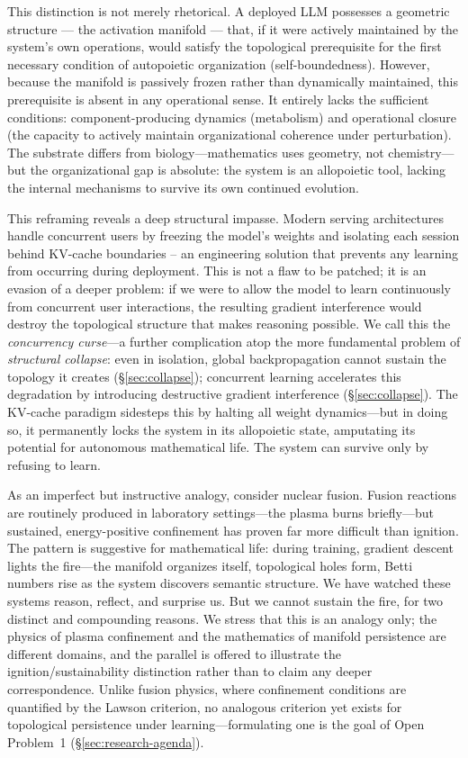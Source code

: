 \documentclass{article}
\begin{document}
This distinction is not merely rhetorical. A deployed LLM possesses a geometric structure --- the activation manifold --- that, if it were actively maintained by the system's own operations, would satisfy the topological prerequisite for the first necessary condition of autopoietic organization \citep{Varela1974autopoiesis} (self-boundedness). However, because the manifold is passively frozen rather than dynamically maintained, this prerequisite is absent in any operational sense. It entirely lacks the sufficient conditions: component-producing dynamics (metabolism) and operational closure (the capacity to actively maintain organizational coherence under perturbation). The substrate differs from biology---mathematics uses geometry, not chemistry---but the organizational gap is absolute: the system is an allopoietic tool, lacking the internal mechanisms to survive its own continued evolution.

This reframing reveals a deep structural impasse. Modern serving architectures handle concurrent users by freezing the model's weights and isolating each session behind KV-cache boundaries -- an engineering solution that prevents any learning from occurring during deployment. This is not a flaw to be patched; it is an evasion of a deeper problem: if we were to allow the model to learn continuously from concurrent user interactions, the resulting gradient interference would destroy the topological structure that makes reasoning possible. We call this the \emph{concurrency curse}---a further complication atop the more fundamental problem of \emph{structural collapse}: even in isolation, global backpropagation cannot sustain the topology it creates (\S\ref{sec:collapse}); concurrent learning accelerates this degradation by introducing destructive gradient interference (\S\ref{sec:collapse}). The KV-cache paradigm sidesteps this by halting all weight dynamics---but in doing so, it permanently locks the system in its allopoietic state, amputating its potential for autonomous mathematical life. The system can survive only by refusing to learn.

As an imperfect but instructive analogy, consider nuclear fusion. Fusion reactions are routinely produced in laboratory settings---the plasma burns briefly---but sustained, energy-positive confinement has proven far more difficult than ignition. The pattern is suggestive for mathematical life: during training, gradient descent lights the fire---the manifold organizes itself, topological holes form, Betti numbers rise as the system discovers semantic structure. We have watched these systems reason, reflect, and surprise us. But we cannot sustain the fire, for two distinct and compounding reasons. We stress that this is an analogy only; the physics of plasma confinement and the mathematics of manifold persistence are different domains, and the parallel is offered to illustrate the ignition/sustainability distinction rather than to claim any deeper correspondence. Unlike fusion physics, where confinement conditions are quantified by the Lawson criterion, no analogous criterion yet exists for topological persistence under learning---formulating one is the goal of Open Problem~1 (\S\ref{sec:research-agenda}).
\end{document}
